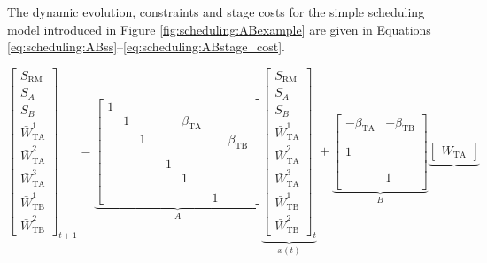 The dynamic evolution, constraints and stage costs for the simple
scheduling model introduced in Figure \ref{fig:scheduling:ABexample}
are given in Equations
\eqref{eq:scheduling:ABss}--\eqref{eq:scheduling:ABstage_cost}.


\begin{equation}
\label{eq:scheduling:ABss}
\begin{bmatrix}S_{\text{RM}}\\S_A\\S_B\\\bar{W}_{\text{TA}}^1\\ 
\bar{W}_{\text{TA}}^2\\\bar{W}_{\text{TA}}^3\\\bar{W}_{\text{TB}}^1
\\\bar{W}_{\text{TB}}^2\end{bmatrix}_{t+1}
= \underbrace{\begin{bmatrix}
 1& & & & & & & \\
 &1 & & & &\beta_{\text{TA}} & & \\ 
 & &1 & & & & &\beta_{\text{TB}} \\
 & & & & & & & \\
 & & & &1 & & & \\
 & & & & &1 & & \\
 & & & & & & & \\
 & & & & & &1
 & \end{bmatrix}}_{A}\underbrace{\begin{bmatrix}S_{\text{RM}}\\
S_A\\S_B\\\bar{W}_{\text{TA}}^1\\\bar{W}_{\text{TA}}^2\\
\bar{W}_{\text{TA}}^3\\\bar{W}_{\text{TB}}^1\\
\bar{W}_{\text{TB}}^2\end{bmatrix}_{t}}_{x(t)}+
\underbrace{
\begin{bmatrix}
-\beta_{\text{TA}} & -\beta_{\text{TB}}\\
 & \\
 & \\
1 & \\
 & \\
 & \\
 &1 \\
 & \end{bmatrix}
}_{B}\underbrace{\begin{bmatrix}W_{\text{TA}}

\end{bmatrix}}
\end{equation}
